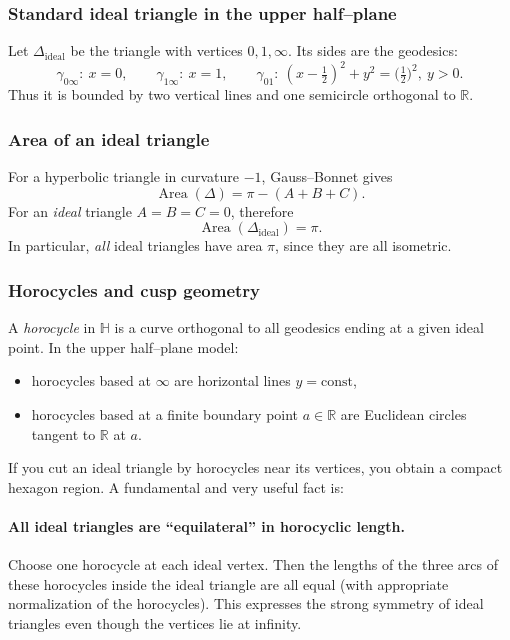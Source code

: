 \documentclass[12pt,a4paper]{article}
\newcommand{\R}{\mathbb{R}}
\DeclareMathOperator{\Area}{Area}
\newcommand{\HH}{\mathbb{H}}
\theoremstyle{plain}
\theoremstyle{definition}      %
\begin{document}
	\subsubsection*{Standard ideal triangle in the upper half–plane}
	Let $\Delta_{\mathrm{ideal}}$ be the triangle with vertices $0,1,\infty$.
	Its sides are the geodesics:
	\[
	\gamma_{0\infty}:\ x=0,\qquad
	\gamma_{1\infty}:\ x=1,\qquad
	\gamma_{01}:\ (x-\tfrac12)^2+y^2=\bigl(\tfrac12\bigr)^2,\ y>0.
	\]
	Thus it is bounded by two vertical lines and one semicircle orthogonal to $\R$.
	
	\subsubsection*{Area of an ideal triangle}
	For a hyperbolic triangle in curvature $-1$, Gauss--Bonnet gives
	\[
	\Area(\Delta)=\pi-(A+B+C).
	\]
	For an \emph{ideal} triangle $A=B=C=0$, therefore
	\[
	\Area(\Delta_{\mathrm{ideal}})=\pi.
	\]
	In particular, \emph{all} ideal triangles have area $\pi$, since they are all isometric.
	
	\subsubsection*{Horocycles and cusp geometry}
	A \emph{horocycle} in $\HH$ is a curve orthogonal to all geodesics ending at a given ideal point.
	In the upper half–plane model:
	\begin{itemize}
		\item horocycles based at $\infty$ are horizontal lines $y=\text{const}$,
		\item horocycles based at a finite boundary point $a\in\R$ are Euclidean circles tangent to $\R$ at $a$.
	\end{itemize}
	
	If you cut an ideal triangle by horocycles near its vertices, you obtain a compact hexagon region.
	A fundamental and very useful fact is:
	
	\paragraph{All ideal triangles are ``equilateral'' in horocyclic length.}
	Choose one horocycle at each ideal vertex. Then the lengths of the three arcs of these horocycles inside the ideal triangle
	are all equal (with appropriate normalization of the horocycles). This expresses the strong symmetry of ideal triangles
	even though the vertices lie at infinity.
	
\end{document}
